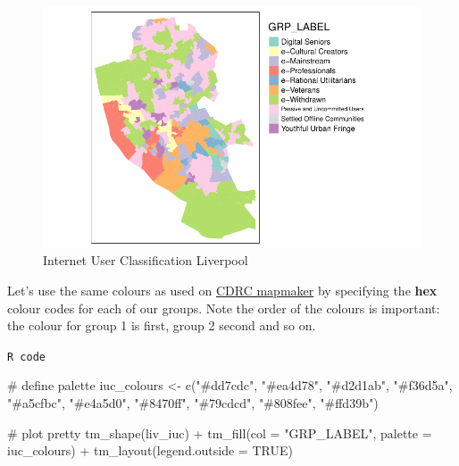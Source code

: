 \documentclass[
  letterpaper,
  DIV=11,
  numbers=noendperiod]{scrreprt}
\newenvironment{Shaded}{\begin{snugshade}}{\end{snugshade}}
\newcommand{\AttributeTok}[1]{\textcolor[rgb]{0.40,0.45,0.13}{#1}}
\newcommand{\CommentTok}[1]{\textcolor[rgb]{0.37,0.37,0.37}{#1}}
\newcommand{\ConstantTok}[1]{\textcolor[rgb]{0.56,0.35,0.01}{#1}}
\newcommand{\FunctionTok}[1]{\textcolor[rgb]{0.28,0.35,0.67}{#1}}
\newcommand{\NormalTok}[1]{\textcolor[rgb]{0.00,0.23,0.31}{#1}}
\newcommand{\OtherTok}[1]{\textcolor[rgb]{0.00,0.23,0.31}{#1}}
\newcommand{\SpecialCharTok}[1]{\textcolor[rgb]{0.37,0.37,0.37}{#1}}
\newcommand{\StringTok}[1]{\textcolor[rgb]{0.13,0.47,0.30}{#1}}
\begin{document}
\begin{figure}[H]

{\centering \includegraphics{01-geodemographics_files/figure-pdf/fig-geo-plot-those-spatial-data-1.pdf}

}

\caption{\label{fig-geo-plot-those-spatial-data}Internet User
Classification Liverpool}

\end{figure}

Let's use the same colours as used on
\href{https://mapmaker.cdrc.ac.uk/\#/internet-user-classification?lon=-2.81187\&lat=53.31045\&zoom=9.58}{CDRC
mapmaker} by specifying the \textbf{hex} colour codes for each of our
groups. Note the order of the colours is important: the colour for group
1 is first, group 2 second and so on.

\begin{codelisting}

\caption{\texttt{R code}}

\begin{Shaded}
\begin{Highlighting}[]
\CommentTok{\# define palette}
\NormalTok{iuc\_colours }\OtherTok{\textless{}{-}} \FunctionTok{c}\NormalTok{(}\StringTok{"\#dd7cdc"}\NormalTok{, }\StringTok{"\#ea4d78"}\NormalTok{, }\StringTok{"\#d2d1ab"}\NormalTok{, }\StringTok{"\#f36d5a"}\NormalTok{, }\StringTok{"\#a5cfbc"}\NormalTok{, }\StringTok{"\#e4a5d0"}\NormalTok{,}
    \StringTok{"\#8470ff"}\NormalTok{, }\StringTok{"\#79cdcd"}\NormalTok{, }\StringTok{"\#808fee"}\NormalTok{, }\StringTok{"\#ffd39b"}\NormalTok{)}

\CommentTok{\# plot pretty}
\FunctionTok{tm\_shape}\NormalTok{(liv\_iuc) }\SpecialCharTok{+} \FunctionTok{tm\_fill}\NormalTok{(}\AttributeTok{col =} \StringTok{"GRP\_LABEL"}\NormalTok{, }\AttributeTok{palette =}\NormalTok{ iuc\_colours) }\SpecialCharTok{+} \FunctionTok{tm\_layout}\NormalTok{(}\AttributeTok{legend.outside =} \ConstantTok{TRUE}\NormalTok{)}
\end{Highlighting}
\end{Shaded}

\end{codelisting}
\end{document}
